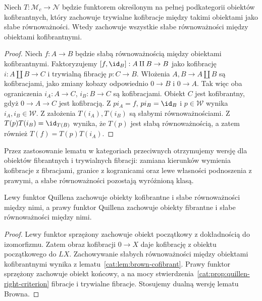 \begin{lemat}\label{cat:lem:brown-cofibrant}
Niech $T:\mathcal M_{c}\to\mathcal N$ będzie funktorem określonym na pełnej podkategorii obiektów kofibrantnych, który zachowuje trywialne kofibracje między takimi obiektami jako słabe równoważności. Wtedy zachowuje wszystkie słabe równoważności między obiektami kofibrantnymi.
\end{lemat}
\begin{proof}
Niech $f:A\to B$ będzie słabą równoważnością między obiektami kofibrantnymi. Faktoryzujemy $[f,\id_B]:A\amalg B\to B$ jako kofibrację $i:A\amalg B\to C$ i trywialną fibrację $p:C\to B$. Włożenia $A,B\to A\amalg B$ są kofibracjami, jako zmiany kobazy odpowiednio $0\to B$ i $0\to A$. Tak więc oba ograniczenia $i_A:A\to C$, $i_B:B\to C$ są kofibracjami. Obiekt $C$ jest kofibrantny, gdyż $0\to A\to C$ jest kofibracją. Z $pi_A=f$, $pi_B=\id_B$ i $p\in\mathcal W$ wynika $i_A,i_B\in\mathcal W$. Z założenia $T(i_A),T(i_B)$ są słabymi równoważnościami. Z $T(p)T(i_B)=\id_{T(B)}$ wynika, że $T(p)$ jest słabą równoważnością, a zatem również $T(f)=T(p)T(i_A)$.
\end{proof}
Przez zastosowanie lematu w kategoriach przeciwnych otrzymujemy wersję dla obiektów fibrantnych i trywialnych fibracji: zamiana kierunków wymienia kofibracje z fibracjami, granice z kogranicami oraz lewe własności podnoszenia z prawymi, a słabe równoważności pozostają wyróżnioną klasą.

\begin{stwierdzenie}\label{cat:prop:quillen-brown}
Lewy funktor Quillena zachowuje obiekty kofibrantne i słabe równoważności między nimi, a prawy funktor Quillena zachowuje obiekty fibrantne i słabe równoważności między nimi.
\end{stwierdzenie}
\begin{proof}
Lewy funktor sprzężony zachowuje obiekt początkowy z dokładnością do izomorfizmu. Zatem obraz kofibracji $0\to X$ daje kofibrację z obiektu początkowego do $LX$. Zachowywanie słabych równoważności między obiektami kofibrantnymi wynika z lematu~\ref{cat:lem:brown-cofibrant}. Prawy funktor sprzężony zachowuje obiekt końcowy, a na mocy stwierdzenia~\ref{cat:prop:quillen-right-criterion} fibracje i trywialne fibracje. Stosujemy dualną wersję lematu Browna.
\end{proof}

